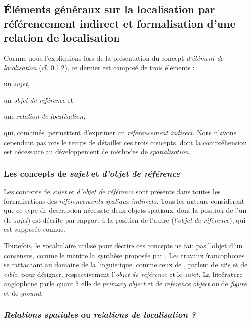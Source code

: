 
\subsection{Éléments généraux sur la localisation par référencement
  indirect et formalisation d'une relation de localisation}

Comme nous l'expliquions lors de la présentation du concept
\emph{d'élément de localisation} (cf. \ref{}), ce dernier est
composé de trois éléments :
%
\begin{enumerate*}[label=(\alph*)]
\item \label{i:site} un \emph{sujet,}
\item \label{i:cible} un \emph{objet de référence} et
\item une \emph{relation de localisation,}
\end{enumerate*}
%
qui, combinés, permettent d'exprimer un \emph{référencement indirect.} 
Nous n'avons cependant pas pris le temps de détailler ces trois
concepts, dont la compréhension est nécessaire au développement de
méthodes de \emph{spatialisation.}

\subsubsection{Les concepts de \emph{sujet} et \emph{d'objet de référence}}

Les concepts de \emph{sujet} et \emph{d'objet de référence} sont
présents dans toutes les formalisations des \emph{référencements
  spatiaux indirects.} Tous les auteurs considèrent que ce type de
description nécessite deux objets spatiaux, dont la position de l'un
(le \emph{sujet}) est décrite par rapport à la position de l'autre
(\emph{l'objet de référence}), qui est supposée connue.

Toutefois, le vocabulaire utilisé pour décrire ces concepts ne fait
pas l'objet d'un consensus, comme le montre la synthèse proposée par
\textcite{RetzSchmidt1988}.  Les travaux francophones se rattachant au
domaine de la linguistique, comme ceux de
\textcite{Vandeloise1986,Borillo1998, Aurnague1997, Mathet2000},
parlent de \emph{site} et de \emph{cible}, pour désigner,
respectivement l'\emph{objet de référence} et le \emph{sujet.} La
littérature anglophone parle quant à elle de \emph{primary object} et
de \emph{reference object} ou de \emph{figure} et de \emph{ground}.

\subsubsection{\emph{Relations spatiales} ou \emph{relations de
    localisation ?}}

